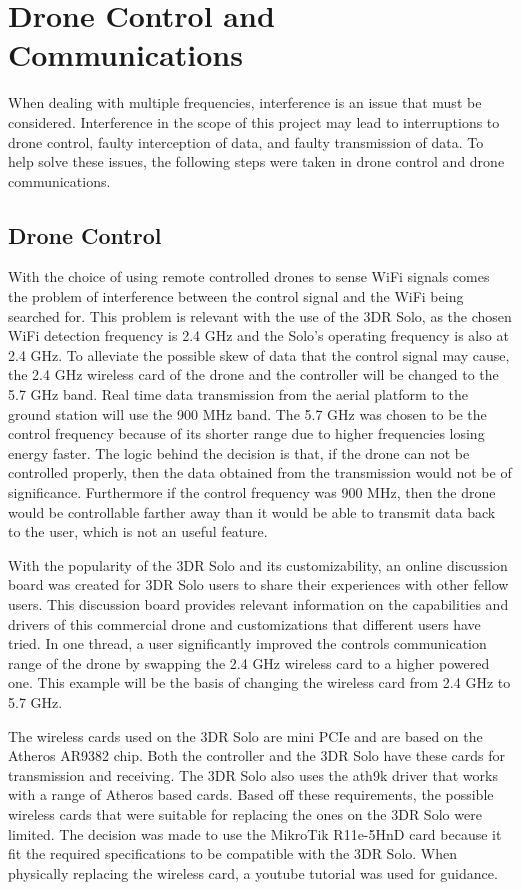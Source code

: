 \section{Drone Control and Communications}
When dealing with multiple frequencies, interference is an issue that must be considered. Interference in the scope of this project may lead to interruptions to drone control, faulty interception of data, and faulty transmission of data. To help solve these issues, the following steps were taken in drone control and drone communications.\par 
\subsection{Drone Control}
With the choice of using remote controlled drones to sense WiFi signals comes the problem of interference between the control signal and the WiFi being searched for. This problem is relevant with the use of the 3DR Solo, as the chosen WiFi detection frequency is 2.4 GHz and the Solo’s operating frequency is also at 2.4 GHz. To alleviate the possible skew of data that the control signal may cause, the 2.4 GHz wireless card of the drone and the controller will be changed to the 5.7 GHz band. Real time data transmission from the aerial platform to the ground station will use the 900 MHz band. The 5.7 GHz was chosen to be the control frequency because of its shorter range due to higher frequencies losing energy faster. The logic behind the decision is that, if the drone can not be controlled properly, then the data obtained from the transmission would not be of significance. Furthermore if the control frequency was 900 MHz, then the drone would be controllable farther away than it would be able to transmit data back to the user, which is not an useful feature.\par 
With the popularity of the 3DR Solo and its customizability, an online discussion board was created for 3DR Solo users to share their experiences with other fellow users. This discussion board provides relevant information on the capabilities and drivers of this commercial drone and customizations that different users have tried. In one thread, a user significantly improved the controls communication range of the drone by swapping the 2.4 GHz wireless card to a higher powered one. This example will be the basis of changing the wireless card from 2.4 GHz to 5.7 GHz.\par 
The wireless cards used on the 3DR Solo are mini PCIe and are based on the Atheros AR9382 chip. Both the controller and the 3DR Solo have these cards for transmission and receiving. The 3DR Solo also uses the ath9k driver that works with a range of Atheros based cards. Based off these requirements, the possible wireless cards that were suitable for replacing the ones on the 3DR Solo were limited. The decision was made to use the MikroTik R11e-5HnD card because it fit the required specifications to be compatible with the 3DR Solo. When physically replacing the wireless card, a youtube tutorial was used for guidance.\par 

